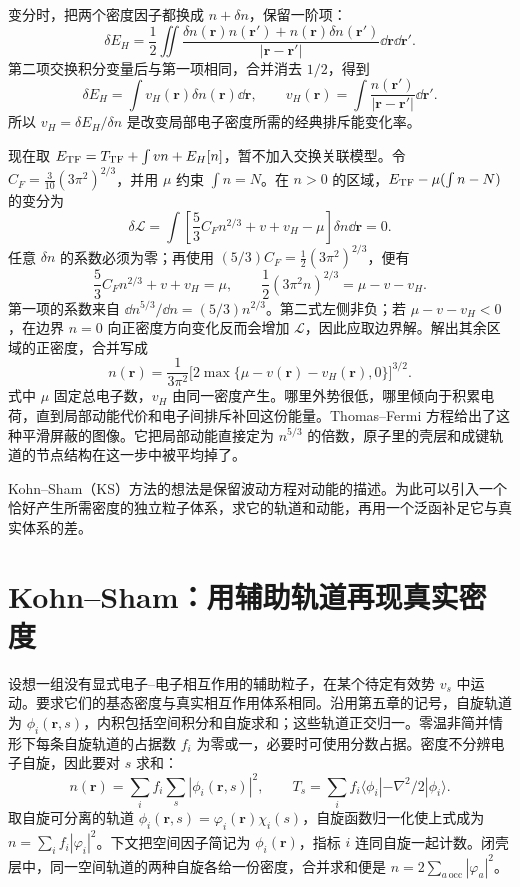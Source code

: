 变分时，把两个密度因子都换成 $n+\delta n$，保留一阶项：
\begin{equation}
\delta E_H=\frac12\iint\frac{\delta n(\bm r)n(\bm r')+n(\bm r)\delta n(\bm r')}{|\bm r-\bm r'|}\dd\bm r\dd\bm r'.
\end{equation}
第二项交换积分变量后与第一项相同，合并消去 $1/2$，得到
\begin{equation}\label{dft:hartree-potential}
\delta E_H=\int v_H(\bm r)\delta n(\bm r)\dd\bm r,\qquad
v_H(\bm r)=\int\frac{n(\bm r')}{|\bm r-\bm r'|}\dd\bm r'.
\end{equation}
所以 $v_H=\delta E_H/\delta n$ 是改变局部电子密度所需的经典排斥能变化率。

现在取 $E_{\rm TF}=T_{\rm TF}+\int vn+E_H[n]$，暂不加入交换关联模型。令 $C_F=\tfrac3{10}(3\pi^2)^{2/3}$，并用 $\mu$ 约束 $\int n=N$。在 $n>0$ 的区域，$E_{\rm TF}-\mu(\int n-N)$ 的变分为
\begin{equation}
\delta\mathcal L=\int\left[\frac53 C_Fn^{2/3}+v+v_H-\mu\right]\delta n\dd\bm r=0.
\end{equation}
任意 $\delta n$ 的系数必须为零；再使用 $(5/3)C_F=\tfrac12(3\pi^2)^{2/3}$，便有
\begin{equation}
\frac53 C_F n^{2/3}+v+v_H=\mu,
\qquad \frac12(3\pi^2n)^{2/3}=\mu-v-v_H.
\end{equation}
第一项的系数来自 $\dd n^{5/3}/\dd n=(5/3)n^{2/3}$。第二式左侧非负；若 $\mu-v-v_H<0$，在边界 $n=0$ 向正密度方向变化反而会增加 $\mathcal L$，因此应取边界解。解出其余区域的正密度，合并写成
\begin{equation}
n(\bm r)=\frac1{3\pi^2}
\bigl[2\max\{\mu-v(\bm r)-v_H(\bm r),0\}\bigr]^{3/2}.
\end{equation}
式中 $\mu$ 固定总电子数，$v_H$ 由同一密度产生。哪里外势很低，哪里倾向于积累电荷，直到局部动能代价和电子间排斥补回这份能量。Thomas--Fermi 方程给出了这种平滑屏蔽的图像。它把局部动能直接定为 $n^{5/3}$ 的倍数，原子里的壳层和成键轨道的节点结构在这一步中被平均掉了。

Kohn--Sham（KS）方法的想法是保留波动方程对动能的描述。为此可以引入一个恰好产生所需密度的独立粒子体系，求它的轨道和动能，再用一个泛函补足它与真实体系的差。

\section{Kohn--Sham：用辅助轨道再现真实密度}
设想一组没有显式电子--电子相互作用的辅助粒子，在某个待定有效势 $v_s$ 中运动。要求它们的基态密度与真实相互作用体系相同。沿用第五章的记号，自旋轨道为 $\phi_i(\bm r,s)$，内积包括空间积分和自旋求和；这些轨道正交归一。零温非简并情形下每条自旋轨道的占据数 $f_i$ 为零或一，必要时可使用分数占据。密度不分辨电子自旋，因此要对 $s$ 求和：
\begin{equation}
n(\bm r)=\sum_i f_i\sum_s|\phi_i(\bm r,s)|^2,\qquad
T_s=\sum_i f_i\langle\phi_i|-\nabla^2/2|\phi_i\rangle.
\end{equation}
取自旋可分离的轨道 $\phi_i(\bm r,s)=\varphi_i(\bm r)\chi_i(s)$，自旋函数归一化使上式成为 $n=\sum_i f_i|\varphi_i|^2$。下文把空间因子简记为 $\phi_i(\bm r)$，指标 $i$ 连同自旋一起计数。闭壳层中，同一空间轨道的两种自旋各给一份密度，合并求和便是 $n=2\sum_{a\,\mathrm{occ}}|\varphi_a|^2$。

